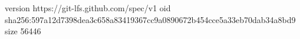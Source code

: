 version https://git-lfs.github.com/spec/v1
oid sha256:597a12d7398dea3c658a83419367cc9a0890672b454cce5a33eb70dab34a8bd9
size 56446
